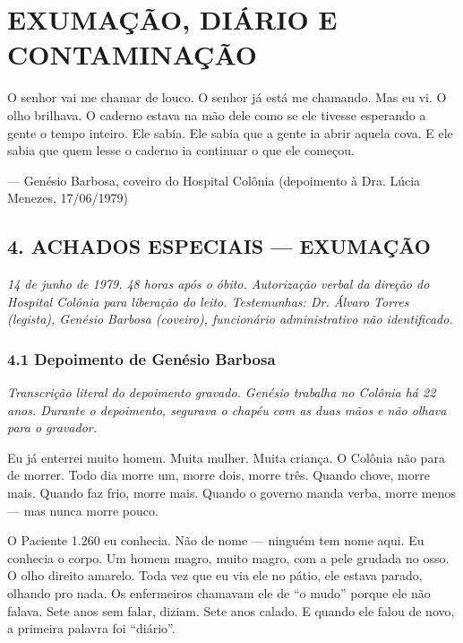 \chapter{EXUMAÇÃO, DIÁRIO E CONTAMINAÇÃO}

\epigraph{O senhor vai me chamar de louco. O senhor já está me chamando. Mas eu vi. O olho brilhava. O caderno estava na mão dele como se ele tivesse esperando a gente o tempo inteiro. Ele sabia. Ele sabia que a gente ia abrir aquela cova. E ele sabia que quem lesse o caderno ia continuar o que ele começou.}{--- Genésio Barbosa, coveiro do Hospital Colônia (depoimento à Dra. Lúcia Menezes, 17/06/1979)}

\vspace{1em}

\section*{4. ACHADOS ESPECIAIS --- EXUMAÇÃO}

\noindent\textit{14 de junho de 1979. 48 horas após o óbito. Autorização verbal da direção do Hospital Colônia para liberação do leito. Testemunhas: Dr. Álvaro Torres (legista), Genésio Barbosa (coveiro), funcionário administrativo não identificado.}
\vspace{1em}

\subsection*{4.1 Depoimento de Genésio Barbosa}

\noindent\textit{Transcrição literal do depoimento gravado. Genésio trabalha no Colônia há 22 anos. Durante o depoimento, segurava o chapéu com as duas mãos e não olhava para o gravador.}
\vspace{1em}

\lettrine{E}{}u já enterrei muito homem. Muita mulher. Muita criança. O Colônia não para de morrer. Todo dia morre um, morre dois, morre três. Quando chove, morre mais. Quando faz frio, morre mais. Quando o governo manda verba, morre menos --- mas nunca morre pouco.

O Paciente 1.260 eu conhecia. Não de nome --- ninguém tem nome aqui. Eu conhecia o corpo. Um homem magro, muito magro, com a pele grudada no osso. O olho direito amarelo. Toda vez que eu via ele no pátio, ele estava parado, olhando pro nada. Os enfermeiros chamavam ele de ``o mudo'' porque ele não falava. Sete anos sem falar, diziam. Sete anos calado. E quando ele falou de novo, a primeira palavra foi ``diário''.


